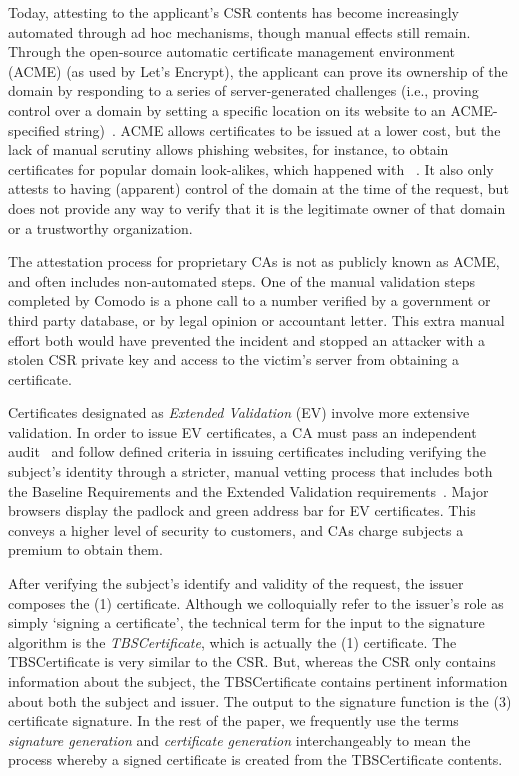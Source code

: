 Today, attesting to the applicant's CSR contents has become increasingly automated through ad hoc mechanisms, though manual effects still remain. Through the open-source automatic certificate management environment (ACME) (as used by Let's Encrypt), the applicant can prove its ownership of the domain by responding to a series of server-generated challenges (i.e., proving control over a domain by setting a specific location on its website to an ACME-specified string)~\cite{ietfacme}. ACME allows certificates to be issued at a lower cost, but the lack of manual scrutiny allows phishing websites, for instance, to obtain certificates for popular domain look-alikes, which happened with ~\cite{lets_encrypt_paypal}. It also only attests to having (apparent) control of the domain at the time of the request, but does not provide any way to verify that it is the legitimate owner of that domain or a trustworthy organization.

The attestation process for proprietary CAs is not as publicly known as ACME, and often includes non-automated steps. One of the manual validation steps completed by Comodo is a phone call to a number verified by a government or third party database, or by legal opinion or accountant letter. This extra manual effort both would have prevented the  incident and stopped an attacker with a stolen CSR private key and access to the victim's server from obtaining a certificate. 

Certificates designated as \emph{Extended Validation} (EV) involve more extensive validation. 
In order to issue EV certificates, a CA must pass an independent audit~\cite{cabaudit} and follow defined criteria in issuing certificates including verifying the subject's identity through a stricter, manual vetting process that includes both the Baseline Requirements and the Extended Validation requirements~\cite{extended_validation_certificate}. 
Major browsers display the padlock and green address bar for EV certificates. This conveys a higher level of security to customers, and CAs charge subjects a premium to obtain them.


After verifying the subject's identify and validity of the request, the issuer composes the (1) certificate. Although we colloquially refer to the issuer's role as simply `signing a certificate', the technical term for the input to the signature algorithm is the \emph{TBSCertificate}, which is actually the (1) certificate. The TBSCertificate is very similar to the CSR. But, whereas the CSR only contains information about the subject, the TBSCertificate contains pertinent information about both the subject and issuer. The output to the signature function is the (3) certificate signature. In the rest of the paper, we frequently use the terms \emph{signature generation} and \emph{certificate generation} interchangeably to mean the process whereby a signed certificate is created from the TBSCertificate contents.

